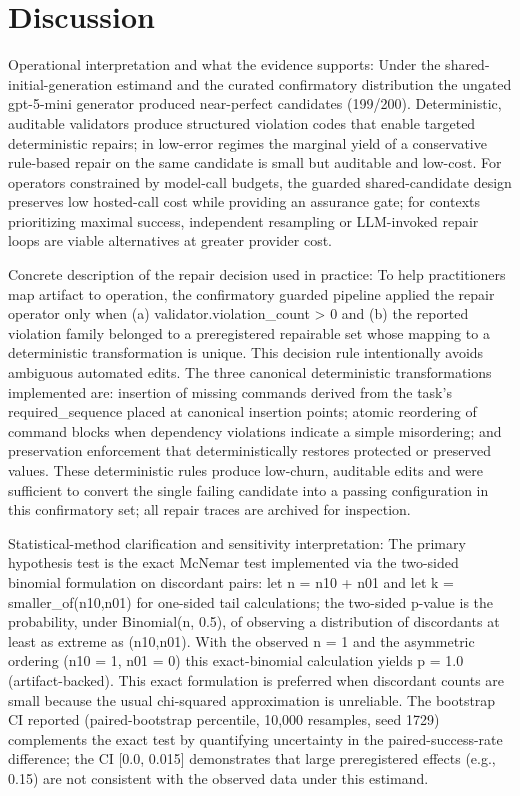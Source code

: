\documentclass[conference]{IEEEtran}
\begin{document}
\section{Discussion}
Operational interpretation and what the evidence supports: Under the shared-initial-generation estimand and the curated confirmatory distribution the ungated gpt-5-mini generator produced near-perfect candidates (199/200). Deterministic, auditable validators produce structured violation codes that enable targeted deterministic repairs; in low-error regimes the marginal yield of a conservative rule-based repair on the same candidate is small but auditable and low-cost. For operators constrained by model-call budgets, the guarded shared-candidate design preserves low hosted-call cost while providing an assurance gate; for contexts prioritizing maximal success, independent resampling or LLM-invoked repair loops are viable alternatives at greater provider cost.

Concrete description of the repair decision used in practice: To help practitioners map artifact to operation, the confirmatory guarded pipeline applied the repair operator only when (a) validator.violation\_count > 0 and (b) the reported violation family belonged to a preregistered repairable set whose mapping to a deterministic transformation is unique. This decision rule intentionally avoids ambiguous automated edits. The three canonical deterministic transformations implemented are: insertion of missing commands derived from the task's required\_sequence placed at canonical insertion points; atomic reordering of command blocks when dependency violations indicate a simple misordering; and preservation enforcement that deterministically restores protected or preserved values. These deterministic rules produce low-churn, auditable edits and were sufficient to convert the single failing candidate into a passing configuration in this confirmatory set; all repair traces are archived for inspection.

Statistical-method clarification and sensitivity interpretation: The primary hypothesis test is the exact McNemar test implemented via the two-sided binomial formulation on discordant pairs: let n = n10 + n01 and let k = smaller\_of(n10,n01) for one-sided tail calculations; the two-sided p-value is the probability, under Binomial(n, 0.5), of observing a distribution of discordants at least as extreme as (n10,n01). With the observed n = 1 and the asymmetric ordering (n10 = 1, n01 = 0) this exact-binomial calculation yields p = 1.0 (artifact-backed). This exact formulation is preferred when discordant counts are small because the usual chi-squared approximation is unreliable. The bootstrap CI reported (paired-bootstrap percentile, 10,000 resamples, seed 1729) complements the exact test by quantifying uncertainty in the paired-success-rate difference; the CI [0.0, 0.015] demonstrates that large preregistered effects (e.g., 0.15) are not consistent with the observed data under this estimand.
\end{document}
